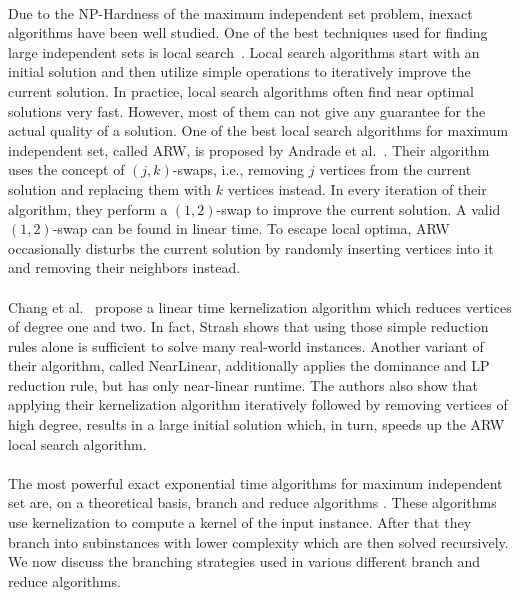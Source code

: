 \documentclass[12pt,a4paper,twoside]{scrartcl}
\numberwithin{equation}{section}
\begin{document}
\paragraph{}
Due to the NP-Hardness of the maximum independent set problem, inexact algorithms have been well studied. One of the best techniques used for finding large independent sets is local search~\cite{ARW, NUMVC}. Local search algorithms start with an initial solution and then utilize simple operations to iteratively improve the current solution. In practice, local search algorithms often find near optimal solutions very fast. However, most of them can not give any guarantee for the actual quality of a solution. One of the best local search algorithms for maximum independent set, called ARW, is proposed by Andrade et al.~\cite{ARW}. Their algorithm uses the concept of $(j,k)$-swaps, i.e., removing $j$ vertices from the current solution and replacing them with $k$ vertices instead. In every iteration of their algorithm, they perform a $(1,2)$-swap to improve the current solution. A valid $(1,2)$-swap can be found in linear time. To escape local optima, ARW occasionally disturbs the current solution by randomly inserting vertices into it and removing their neighbors instead.

\paragraph{}
Chang et al.~\cite{ChangKern} propose a linear time kernelization algorithm which reduces vertices of degree one and two. In fact, Strash \cite{Strash} shows that using those simple reduction rules alone is sufficient to solve many real-world instances. Another variant of their algorithm, called NearLinear, additionally applies the dominance and LP reduction rule, but has only near-linear runtime. The authors also show that applying their kernelization algorithm iteratively followed by removing vertices of high degree, results in a large initial solution which, in turn, speeds up the ARW local search algorithm.
\paragraph{}
The most powerful exact exponential time algorithms for maximum independent set are, on a theoretical basis, branch and reduce algorithms \cite{XiaoNagamochi, ChenXiaKanj}. These algorithms use kernelization to compute a kernel of the input instance. After that they branch into subinstances with lower complexity which are then solved recursively. We now discuss the branching strategies used in various different branch and reduce algorithms.
\end{document}
